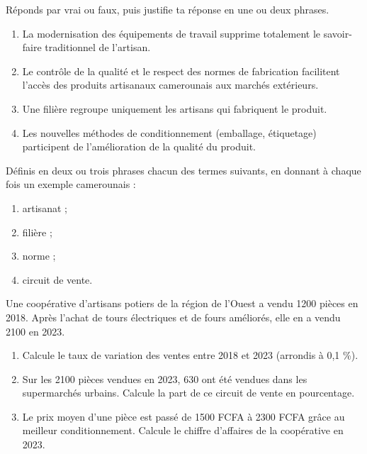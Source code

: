 \documentclass[11pt]{article}
\begin{document}
\begin{exercice}
Réponds par vrai ou faux, puis justifie ta réponse en une ou deux phrases.
\begin{enumerate}
\item La modernisation des équipements de travail supprime totalement le savoir-faire traditionnel de l'artisan.
\item Le contrôle de la qualité et le respect des normes de fabrication facilitent l'accès des produits artisanaux camerounais aux marchés extérieurs.
\item Une filière regroupe uniquement les artisans qui fabriquent le produit.
\item Les nouvelles méthodes de conditionnement (emballage, étiquetage) participent de l'amélioration de la qualité du produit.
\end{enumerate}
\end{exercice}

\begin{exercice}[Définitions]
Définis en deux ou trois phrases chacun des termes suivants, en donnant à chaque fois un exemple camerounais :
\begin{enumerate}
\item artisanat ;
\item filière ;
\item norme ;
\item circuit de vente.
\end{enumerate}
\end{exercice}

\begin{exercice}
Une coopérative d'artisans potiers de la région de l'Ouest a vendu \num{1200} pièces en 2018. Après l'achat de tours électriques et de fours améliorés, elle en a vendu \num{2100} en 2023.
\begin{enumerate}
\item Calcule le taux de variation des ventes entre 2018 et 2023 (arrondis à 0,1 \%).
\item Sur les \num{2100} pièces vendues en 2023, 630 ont été vendues dans les supermarchés urbains. Calcule la part de ce circuit de vente en pourcentage.
\item Le prix moyen d'une pièce est passé de \num{1500} FCFA à \num{2300} FCFA grâce au meilleur conditionnement. Calcule le chiffre d'affaires de la coopérative en 2023.
\end{enumerate}
\end{exercice}
\end{document}
